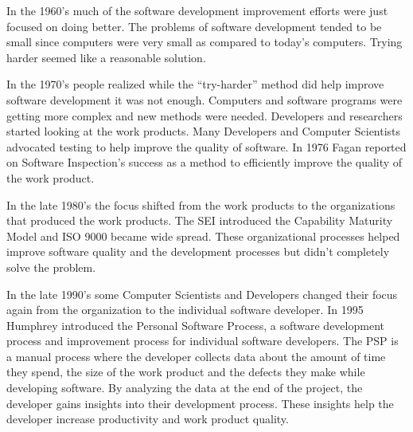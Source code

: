 In the 1960's much of the software development improvement efforts were just
focused on doing better. The problems of software development tended to be
small since computers were very small as compared to today's computers.  Trying
harder seemed like a reasonable solution.  


In the 1970's people realized while the ``try-harder'' method did help improve
software development it was not enough. Computers and software programs were
getting more complex and new methods were needed. Developers and researchers
started looking at the work products. Many Developers and Computer Scientists
advocated testing to help improve the quality of software. In 1976 Fagan
reported on Software Inspection's\cite{Fagan76} success as a method to
efficiently improve the quality of the work product.  

In the late 1980's the focus shifted from the work products to the
organizations that produced the work products. The SEI introduced the Capability
Maturity Model\cite{Paulk95} and ISO 9000\cite{ISO9000} became wide spread.  These
organizational processes helped improve software quality and the development
processes but didn't completely solve the problem.

In the late 1990's some Computer Scientists and Developers changed their focus
again from the organization to the individual software developer. In 1995
Humphrey introduced the Personal Software Process\cite{Humphrey95}, a software
development process and improvement process for individual software developers.
The PSP is a manual process where the developer collects data about the amount
of time they spend, the size of the work product and the defects they make
while developing software.  By analyzing the data at the end of the project,
the developer gains insights into their development process.  These insights
help the developer increase productivity and work product quality.


